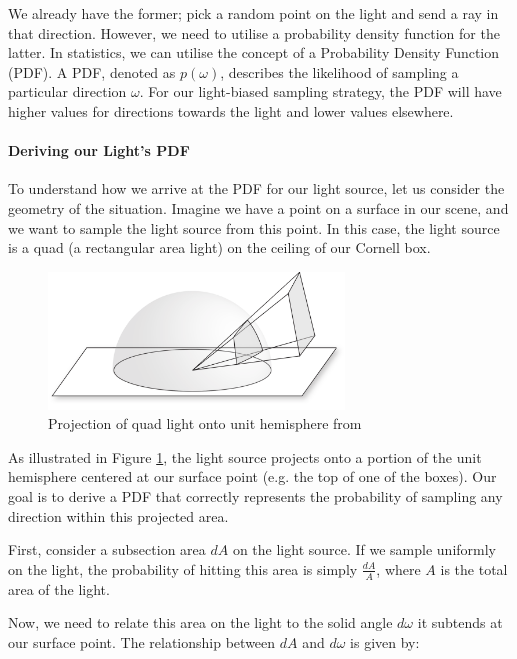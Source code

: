 \documentclass[12pt]{article}
\begin{document}
We already have the former; pick a random point on the light and send a ray in that direction. However, we need to utilise a probability density function for the latter.
In statistics, we can utilise the concept of a Probability Density Function (PDF). A PDF, denoted as $p(\omega)$, describes the likelihood of sampling a particular direction $\omega$. For our light-biased sampling strategy, the PDF will have higher values for directions towards the light and lower values elsewhere.

\paragraph{Deriving our Light's PDF}

To understand how we arrive at the PDF for our light source, let us consider the geometry of the situation. Imagine we have a point on a surface in our scene, and we want to sample the light source from this point. In this case, the light source is a quad (a rectangular area light) on the ceiling of our Cornell box.

\begin{figure}[H]
    \centering
    \includegraphics[width=0.7\textwidth]{images/quad_projection.png}
    \caption{Projection of quad light onto unit hemisphere from  \cite{quadonsphereprojection} }
    \label{fig:quadprojection}
\end{figure}

As illustrated in Figure \ref{fig:quadprojection}, the light source projects onto a portion of the unit hemisphere centered at our surface point (e.g. the top of one of the boxes). Our goal is to derive a PDF that correctly represents the probability of sampling any direction within this projected area.

First, consider a subsection area $dA$ on the light source. If we sample uniformly on the light, the probability of hitting this area is simply $\frac{dA}{A}$, where $A$ is the total area of the light.

Now, we need to relate this area on the light to the solid angle $d\omega$ it subtends at our surface point. The relationship between $dA$ and $d\omega$ is given by:
\end{document}

